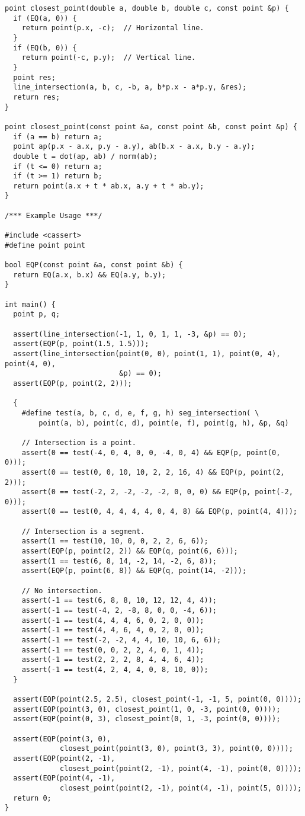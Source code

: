 \begin{lstlisting}
point closest_point(double a, double b, double c, const point &p) {
  if (EQ(a, 0)) {
    return point(p.x, -c);  // Horizontal line.
  }
  if (EQ(b, 0)) {
    return point(-c, p.y);  // Vertical line.
  }
  point res;
  line_intersection(a, b, c, -b, a, b*p.x - a*p.y, &res);
  return res;
}

point closest_point(const point &a, const point &b, const point &p) {
  if (a == b) return a;
  point ap(p.x - a.x, p.y - a.y), ab(b.x - a.x, b.y - a.y);
  double t = dot(ap, ab) / norm(ab);
  if (t <= 0) return a;
  if (t >= 1) return b;
  return point(a.x + t * ab.x, a.y + t * ab.y);
}

/*** Example Usage ***/

#include <cassert>
#define point point

bool EQP(const point &a, const point &b) {
  return EQ(a.x, b.x) && EQ(a.y, b.y);
}

int main() {
  point p, q;

  assert(line_intersection(-1, 1, 0, 1, 1, -3, &p) == 0);
  assert(EQP(p, point(1.5, 1.5)));
  assert(line_intersection(point(0, 0), point(1, 1), point(0, 4), point(4, 0),
                           &p) == 0);
  assert(EQP(p, point(2, 2)));

  {
    #define test(a, b, c, d, e, f, g, h) seg_intersection( \
        point(a, b), point(c, d), point(e, f), point(g, h), &p, &q)

    // Intersection is a point.
    assert(0 == test(-4, 0, 4, 0, 0, -4, 0, 4) && EQP(p, point(0, 0)));
    assert(0 == test(0, 0, 10, 10, 2, 2, 16, 4) && EQP(p, point(2, 2)));
    assert(0 == test(-2, 2, -2, -2, -2, 0, 0, 0) && EQP(p, point(-2, 0)));
    assert(0 == test(0, 4, 4, 4, 4, 0, 4, 8) && EQP(p, point(4, 4)));

    // Intersection is a segment.
    assert(1 == test(10, 10, 0, 0, 2, 2, 6, 6));
    assert(EQP(p, point(2, 2)) && EQP(q, point(6, 6)));
    assert(1 == test(6, 8, 14, -2, 14, -2, 6, 8));
    assert(EQP(p, point(6, 8)) && EQP(q, point(14, -2)));

    // No intersection.
    assert(-1 == test(6, 8, 8, 10, 12, 12, 4, 4));
    assert(-1 == test(-4, 2, -8, 8, 0, 0, -4, 6));
    assert(-1 == test(4, 4, 4, 6, 0, 2, 0, 0));
    assert(-1 == test(4, 4, 6, 4, 0, 2, 0, 0));
    assert(-1 == test(-2, -2, 4, 4, 10, 10, 6, 6));
    assert(-1 == test(0, 0, 2, 2, 4, 0, 1, 4));
    assert(-1 == test(2, 2, 2, 8, 4, 4, 6, 4));
    assert(-1 == test(4, 2, 4, 4, 0, 8, 10, 0));
  }

  assert(EQP(point(2.5, 2.5), closest_point(-1, -1, 5, point(0, 0))));
  assert(EQP(point(3, 0), closest_point(1, 0, -3, point(0, 0))));
  assert(EQP(point(0, 3), closest_point(0, 1, -3, point(0, 0))));

  assert(EQP(point(3, 0),
             closest_point(point(3, 0), point(3, 3), point(0, 0))));
  assert(EQP(point(2, -1),
             closest_point(point(2, -1), point(4, -1), point(0, 0))));
  assert(EQP(point(4, -1),
             closest_point(point(2, -1), point(4, -1), point(5, 0))));
  return 0;
}
\end{lstlisting}
